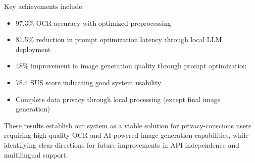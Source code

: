 Key achievements include:
\begin{itemize}
    \item 97.3\% OCR accuracy with optimized preprocessing
    \item 81.5\% reduction in prompt optimization latency through local LLM deployment
    \item 48\% improvement in image generation quality through prompt optimization
    \item 78.4 SUS score indicating good system usability
    \item Complete data privacy through local processing (except final image generation)
\end{itemize}

These results establish our system as a viable solution for privacy-conscious users requiring high-quality OCR and AI-powered image generation capabilities, while identifying clear directions for future improvements in API independence and multilingual support.